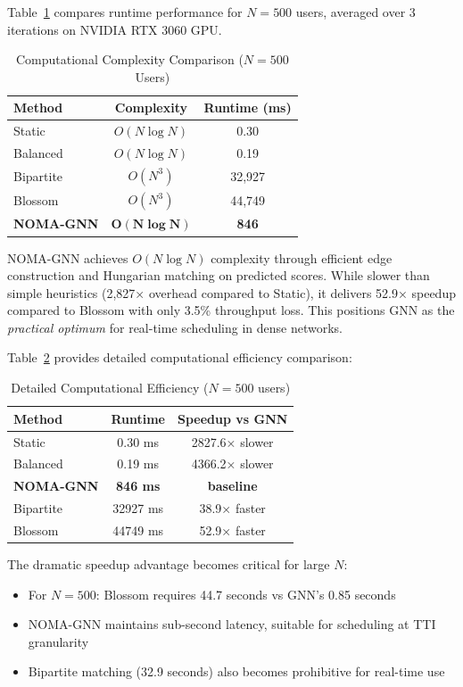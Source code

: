 Table~\ref{tab:complexity} compares runtime performance for $N=500$ users, averaged over 3 iterations on NVIDIA RTX 3060 GPU.

\begin{table}[!t]
\centering
\caption{Computational Complexity Comparison ($N=500$ Users)}
\label{tab:complexity}
\begin{tabular}{l c c}
\toprule
\textbf{Method} & \textbf{Complexity} & \textbf{Runtime (ms)} \\
\midrule
Static & $O(N \log N)$ & 0.30 \\
Balanced & $O(N \log N)$ & 0.19 \\
Bipartite & $O(N^3)$ & 32,927 \\
Blossom & $O(N^3)$ & 44,749 \\
\textbf{NOMA-GNN} & $\boldsymbol{O(N \log N)}$ & \textbf{846} \\
\bottomrule
\end{tabular}
\end{table}

NOMA-GNN achieves $O(N \log N)$ complexity through efficient edge construction and Hungarian matching on predicted scores. While slower than simple heuristics (2,827× overhead compared to Static), it delivers 52.9× speedup compared to Blossom with only 3.5\% throughput loss. This positions GNN as the \emph{practical optimum} for real-time scheduling in dense networks.

Table~\ref{tab:timing_detailed} provides detailed computational efficiency comparison:

\begin{table}[!t]
\centering
\caption{Detailed Computational Efficiency ($N=500$ users)}
\label{tab:timing_detailed}
\begin{tabular}{lcc}
\toprule
\textbf{Method} & \textbf{Runtime} & \textbf{Speedup vs GNN} \\
\midrule
Static & 0.30 ms & 2827.6× slower \\
Balanced & 0.19 ms & 4366.2× slower \\
\midrule
\textbf{NOMA-GNN} & \textbf{846 ms} & \textbf{baseline} \\
\midrule
Bipartite & 32927 ms & 38.9× faster \\
Blossom & 44749 ms & 52.9× faster \\
\bottomrule
\end{tabular}
\end{table}

The dramatic speedup advantage becomes critical for large $N$:
\begin{itemize}
    \item For $N=500$: Blossom requires 44.7 seconds vs GNN's 0.85 seconds
    \item NOMA-GNN maintains sub-second latency, suitable for scheduling at TTI granularity
    \item Bipartite matching (32.9 seconds) also becomes prohibitive for real-time use
\end{itemize}

